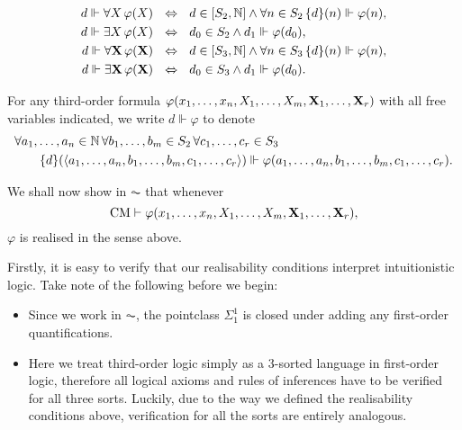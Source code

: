 \documentclass[11pt]{article}
\theoremstyle{plain}
\theoremstyle{definition}
\newcommand{\tuple}[1]{\left\langle #1 \right\rangle}
\begin{document}
\begin{align*}
    d \Vdash \forall X \, \varphi\mleft(X\mright) \ \                    & \ratio\Leftrightarrow \ \ d \in \left[S_2, \mathbb{N}\right] \land \forall n \in S_2 \, \mleft\{d\mright\}\mleft(n\mright) \Vdash \varphi\mleft(n\mright),     \\
    d \Vdash \exists X \, \varphi\mleft(X\mright) \ \                    & \ratio\Leftrightarrow \ \ d_0 \in S_2 \land d_1 \Vdash \varphi\mleft(d_0\mright),                                                                              \\
    d \Vdash \forall \mathbf{X} \, \varphi\mleft(\mathbf{X}\mright) \ \  & \ratio\Leftrightarrow \ \ d \in \left[S_3, \mathbb{N}\right] \land \forall n \in S_3 \, \mleft\{d\mright\}\mleft(n\mright) \Vdash \varphi\mleft(n\mright),     \\
    d \Vdash \exists \mathbf{X} \, \varphi\mleft(\mathbf{X}\mright) \ \  & \ratio\Leftrightarrow \ \ d_0 \in S_3 \land d_1 \Vdash \varphi\mleft(d_0\mright).
\end{align*}

For any third-order formula $\varphi\mleft(x_1, \ldots, x_n, X_1, \ldots, X_m, \mathbf{X}_1, \ldots, \mathbf{X}_r\mright)$ with all free variables indicated, we write $d \Vdash \varphi$ to denote
\begin{align*}
     & \forall a_1, \ldots, a_n \in \mathbb{N} \, \forall b_1, \ldots, b_m \in S_2 \, \forall c_1, \ldots, c_r \in S_3                                                                         \\
     & \qquad \mleft\{d\mright\}\mleft(\tuple{a_1, \ldots, a_n, b_1, \ldots, b_m, c_1, \ldots, c_r}\mright) \Vdash \varphi\mleft(a_1, \ldots, a_n, b_1, \ldots, b_m, c_1, \ldots, c_r\mright).
\end{align*}

We shall now show in $\AC$ that whenever
\[\mathrm{CM} \vdash \varphi\mleft(x_1, \ldots, x_n, X_1, \ldots, X_m, \mathbf{X}_1, \ldots, \mathbf{X}_r\mright),\]
$\varphi$ is realised in the sense above.

Firstly, it is easy to verify that our realisability conditions interpret intuitionistic logic. Take note of the following before we begin:
\begin{itemize}
    \item Since we work in $\AC$, the pointclass $\Sigma^1_1$ is closed under adding any first-order quantifications.
    \item Here we treat third-order logic simply as a $3$-sorted language in first-order logic, therefore all logical axioms and rules of inferences have to be verified for all three sorts. Luckily, due to the way we defined the realisability conditions above, verification for all the sorts are entirely analogous.
\end{itemize}
\end{document}
